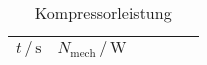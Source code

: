 \begin{table}
\centering
\caption{Kompressorleistung}
\begin{tabular}{c c c c c c}
\toprule

$t \,/\, \si{\second}$ &
$ N_\text{mech} \,/\, \si{\watt}$ \\
\midrule

\bottomrule
\end{tabular}
\end{table}
